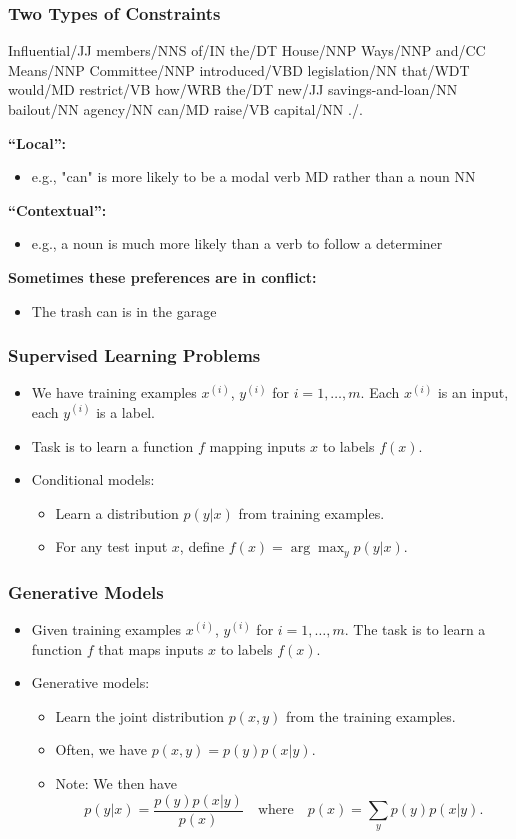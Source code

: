 \documentclass[handout]{beamer}
\begin{document}
\begin{frame}
  \frametitle{Two Types of Constraints}
  Influential/JJ members/NNS of/IN the/DT House/NNP Ways/NNP and/CC Means/NNP Committee/NNP introduced/VBD legislation/NN that/WDT would/MD restrict/VB how/WRB the/DT new/JJ savings-and-loan/NN bailout/NN agency/NN can/MD raise/VB capital/NN ./.

  \textbf{``Local'':}
  \begin{itemize}
    \item e.g., "can" is more likely to be a modal verb MD rather than a noun NN
  \end{itemize}

  \textbf{``Contextual'':}
  \begin{itemize}
    \item e.g., a noun is much more likely than a verb to follow a determiner
  \end{itemize}

  \textbf{Sometimes these preferences are in conflict:}
  \begin{itemize}
    \item The trash can is in the garage
  \end{itemize}
\end{frame}

\begin{frame}
  \frametitle{Supervised Learning Problems}
  \begin{itemize}
    \item We have training examples $x^{(i)}$, $y^{(i)}$ for $i = 1, \ldots, m$. Each $x^{(i)}$ is an input, each $y^{(i)}$ is a label.
    \item Task is to learn a function $f$ mapping inputs $x$ to labels $f(x)$.
    \item Conditional models:
    \begin{itemize}
      \item Learn a distribution $p(y|x)$ from training examples.
      \item For any test input $x$, define $f(x) = \arg \max_y p(y|x)$.
    \end{itemize}
  \end{itemize}
\end{frame}

\begin{frame}
  \frametitle{Generative Models}
  \begin{itemize}
    \item Given training examples $x^{(i)}$, $y^{(i)}$ for $i = 1, \ldots, m$. The task is to learn a function $f$ that maps inputs $x$ to labels $f(x)$.
    \item Generative models:
    \begin{itemize}
      \item Learn the joint distribution $p(x, y)$ from the training examples.
      \item Often, we have $p(x, y) = p(y)p(x|y)$.
      \item Note: We then have
      \[
        p(y|x) = \frac{p(y)p(x|y)}{p(x)} \quad \text{where} \quad p(x) = \sum_y p(y)p(x|y).
      \]
    \end{itemize}
  \end{itemize}
\end{frame}
\end{document}
